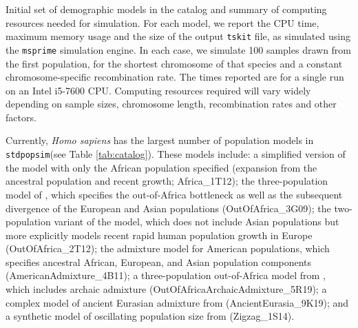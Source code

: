 \documentclass[12pt,halfline,a4paper]{ouparticle}
\newcommand{\stdpopsim}{\texttt{stdpopsim}\xspace}
\newcommand{\tskit}{\texttt{tskit}\xspace}
\begin{document}
\renewcommand{\arraystretch}{1.2}
\begin{table}[t]
\makebox[\textwidth][c]{
    \begin{footnotesize}
    
    \end{footnotesize}
}
\caption{\label{tab:catalog}
Initial set of demographic models in the catalog and summary of computing resources needed for simulation.
For each model, we report the CPU time, maximum memory usage and the
size of the output \tskit file, as simulated using the \texttt{msprime} simulation engine.
In each case, we simulate 100 samples
drawn from the first population, for the shortest chromosome of that species
and a constant chromosome-specific recombination rate.
The times reported are for a single run on an Intel i5-7600 CPU.
Computing resources required will vary widely depending on sample sizes, chromosome length,
recombination rates and other factors.
}
\end{table}

Currently, {\em Homo sapiens} has the largest number of population models in
\stdpopsim (see Table \ref{tab:catalog}).
These models include: a simplified version of the \cite{tennessen2012evolution}
model with only the African population specified (expansion from the ancestral
population and recent growth; Africa\_1T12); the three-population model of \cite{gutenkunst2009inferring},
which specifies the out-of-Africa bottleneck as well as the subsequent divergence of
the European and Asian populations (OutOfAfrica\_3G09); the \cite{tennessen2012evolution} two-population variant of the
\citeauthor{gutenkunst2009inferring} model, which does not include Asian populations but more explicitly models
recent rapid human population growth in Europe (OutOfAfrica\_2T12); the \cite{browning2018ancestry} admixture model
for American populations, which specifies ancestral African, European, and Asian population
components (AmericanAdmixture\_4B11); a three-population out-of-Africa model from \cite{ragsdale2019models},
which includes archaic admixture (OutOfAfricaArchaicAdmixture\_5R19);
a complex model of ancient Eurasian admixture from \cite{kamm2019efficiently} (AncientEurasia\_9K19);
and a synthetic model of oscillating population size from \cite{schiffels2014inferring} (Zigzag\_1S14).
\end{document}

